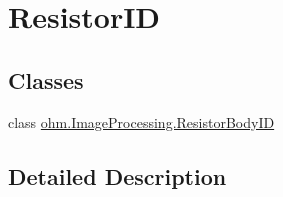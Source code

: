 \hypertarget{group___resistor_i_d}{}\section{Resistor\+ID}
\label{group___resistor_i_d}
\subsection*{Classes}
\begin{DoxyCompactItemize}
\item 
class \hyperlink{classohm_1_1_image_processing_1_1_resistor_body_i_d}{ohm.\+Image\+Processing.\+Resistor\+Body\+ID}
\end{DoxyCompactItemize}


\subsection{Detailed Description}
